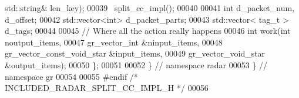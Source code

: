 \begin{DoxyCode}
      std::string& len\_key);
00039       ~split_cc_impl();
00040       
00041       \textcolor{keywordtype}{int} d_packet_num, d_offset;
00042       std::vector<int> d_packet_parts;
00043       std::vector< tag\_t > d_tags;
00044 
00045       \textcolor{comment}{// Where all the action really happens}
00046       \textcolor{keywordtype}{int} work(\textcolor{keywordtype}{int} noutput\_items,
00047                gr\_vector\_int &ninput\_items,
00048                gr\_vector\_const\_void\_star &input\_items,
00049                gr\_vector\_void\_star &output\_items);
00050     \};
00051 
00052   \} \textcolor{comment}{// namespace radar}
00053 \} \textcolor{comment}{// namespace gr}
00054 
00055 \textcolor{preprocessor}{#endif }\textcolor{comment}{/* INCLUDED\_RADAR\_SPLIT\_CC\_IMPL\_H */}\textcolor{preprocessor}{}
00056 
\end{DoxyCode}
